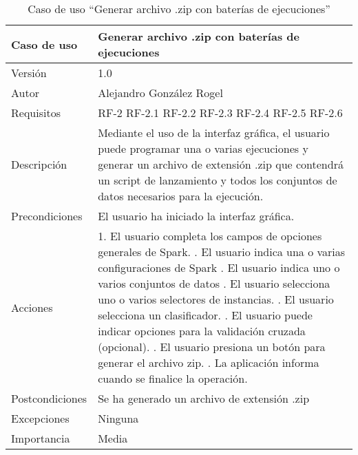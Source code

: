  
\begin{table}
  \begin{center}
   \begin{tabular}{|>{} L{3cm} | L{9cm} |}
    \hline
    Caso de uso & Generar archivo .zip con baterías de ejecuciones\\
    \hline
    Versión & 1.0 \\
    \hline
    Autor & Alejandro González Rogel \\
    \hline
    Requisitos & 
    		RF-2\newline
    		RF-2.1\newline
		RF-2.2\newline
		RF-2.3\newline
		RF-2.4\newline
		RF-2.5\newline
		RF-2.6\\
    \hline
    Descripción & Mediante el uso de la interfaz gráfica, el usuario puede programar una o varias ejecuciones y generar un archivo de extensión .zip que contendrá un script de lanzamiento y todos los conjuntos de datos necesarios para la ejecución.\\
    \hline
    Precondiciones & El usuario ha iniciado la interfaz gráfica. \\
    \hline
    Acciones & 1. El usuario completa los campos de opciones generales de Spark. . El usuario indica una o varias configuraciones de Spark . El usuario indica uno o varios conjuntos de datos . El usuario selecciona uno o varios selectores de instancias. . El usuario selecciona un clasificador. . El usuario puede indicar opciones para la validación cruzada (opcional). . El usuario presiona un botón para generar el archivo zip. . La aplicación informa cuando se finalice la operación.
    			   \\
    \hline
    Postcondiciones & Se ha generado un archivo de extensión .zip \\
    \hline
    Excepciones & Ninguna \\
    \hline
    Importancia & Media \\
    \hline
   \end{tabular}
   \caption{Caso de uso ``Generar archivo .zip con baterías de ejecuciones''}
   \label{tabla:casoUso3}
  \end{center}
 \end{table}  
 
